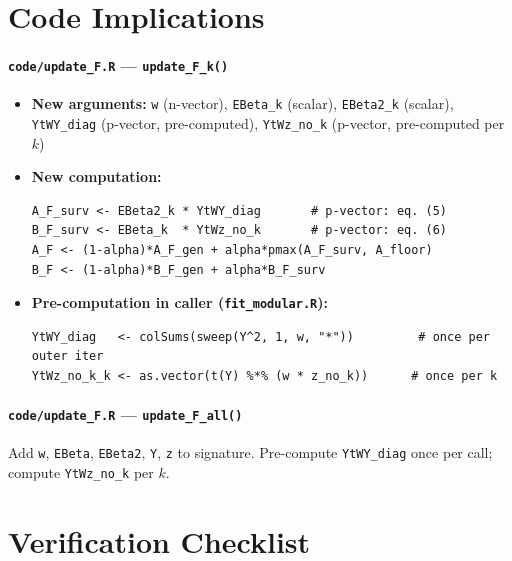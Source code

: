 \documentclass[11pt]{article}
\begin{document}
\section{Code Implications}

\paragraph{\texttt{code/update\_F.R} — \texttt{update\_F\_k()}}
\begin{itemize}
  \item \textbf{New arguments:} \texttt{w} (n-vector), \texttt{EBeta\_k} (scalar),
        \texttt{EBeta2\_k} (scalar), \texttt{YtWY\_diag} (p-vector, pre-computed),
        \texttt{YtWz\_no\_k} (p-vector, pre-computed per $k$)
  \item \textbf{New computation:}
    \begin{verbatim}
A_F_surv <- EBeta2_k * YtWY_diag       # p-vector: eq. (5)
B_F_surv <- EBeta_k  * YtWz_no_k       # p-vector: eq. (6)
A_F <- (1-alpha)*A_F_gen + alpha*pmax(A_F_surv, A_floor)
B_F <- (1-alpha)*B_F_gen + alpha*B_F_surv
    \end{verbatim}
  \item \textbf{Pre-computation in caller (\texttt{fit\_modular.R}):}
    \begin{verbatim}
YtWY_diag   <- colSums(sweep(Y^2, 1, w, "*"))         # once per outer iter
YtWz_no_k_k <- as.vector(t(Y) %*% (w * z_no_k))      # once per k
    \end{verbatim}
\end{itemize}

\paragraph{\texttt{code/update\_F.R} — \texttt{update\_F\_all()}}
Add \texttt{w}, \texttt{EBeta}, \texttt{EBeta2}, \texttt{Y}, \texttt{z} to signature.
Pre-compute \texttt{YtWY\_diag} once per call; compute \texttt{YtWz\_no\_k} per $k$.

\section{Verification Checklist}
\end{document}
